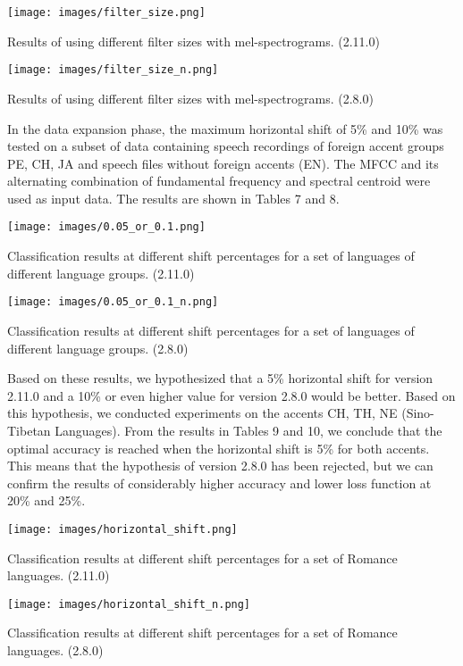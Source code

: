 \documentclass[ams]{U-AizuGT}
\begin{document}
\begin{table}[h]
    \centering
    \texttt{[image: images/filter\_size.png]}
    \caption{Results of using different filter sizes with mel-spectrograms. (2.11.0)}
\end{table}
\begin{table}[h]
    \centering
    \texttt{[image: images/filter\_size\_n.png]}
    \caption{Results of using different filter sizes with mel-spectrograms. (2.8.0)}
\end{table}

In the data expansion phase, the maximum horizontal shift of 5\% and 10\% was tested on a subset of data containing speech recordings of foreign accent groups {PE, CH, JA} and speech files without foreign accents (EN). The MFCC and its alternating combination of fundamental frequency and spectral centroid were used as input data. The results are shown in Tables 7 and 8.
\begin{table}[h]
    \centering
    \texttt{[image: images/0.05\_or\_0.1.png]}
    \caption{Classification results at different shift percentages for a set of languages of different language groups. (2.11.0)}
\end{table}
\begin{table}[h]
    \centering
    \texttt{[image: images/0.05\_or\_0.1\_n.png]}
    \caption{Classification results at different shift percentages for a set of languages of different language groups. (2.8.0)}
\end{table}

Based on these results, we hypothesized that a 5\% horizontal shift for version 2.11.0 and a 10\% or even higher value for version 2.8.0 would be better. Based on this hypothesis, we conducted experiments on the accents {CH, TH, NE} (Sino-Tibetan Languages). From the results in Tables 9 and 10, we conclude that the optimal accuracy is reached when the horizontal shift is 5\% for both accents. This means that the hypothesis of version 2.8.0 has been rejected, but we can confirm the results of considerably higher accuracy and lower loss function at 20\% and 25\%.

\begin{table}[h]
    \centering
    \texttt{[image: images/horizontal\_shift.png]}
    \caption{Classification results at different shift percentages for a set of Romance languages. (2.11.0)}
\end{table}
\begin{table}[h]
    \centering
    \texttt{[image: images/horizontal\_shift\_n.png]}
    \caption{Classification results at different shift percentages for a set of Romance languages. (2.8.0)}
\end{table}
\end{document}
